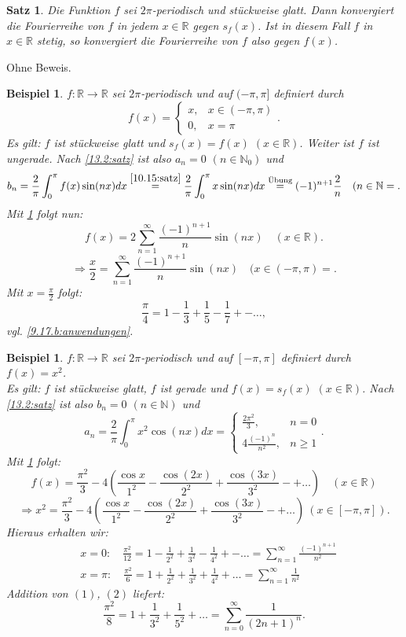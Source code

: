 \documentclass[12pt]{extreport} %
\newcommand{\N}{\mathbb{N}}
\newcommand{\R}{\mathbb{R}}
\theoremstyle{named}
\theoremstyle{itshape}
\newtheorem{satz}[unnamedtheorem]{Satz}
\theoremstyle{normal}
\newtheorem{beispiel}[unnamedtheorem]{Beispiel}
\begin{document}
{\begin{satz} \label{13.3:satz}
	Die Funktion $f$ sei $2\pi$-periodisch und stückweise glatt. Dann konvergiert die Fourierreihe von $f$ in jedem $x \in \R$ gegen $s_{f}(x)$. 
	Ist in diesem Fall $f$ in $x \in \R$ stetig, so konvergiert die Fourierreihe von $f$ also gegen $f(x)$.	
\end{satz}

Ohne Beweis.

\begin{beispiel} \label{13.4:bsp}
	$f \colon \R \rightarrow \R$ sei $2\pi$-periodisch und auf $(-\pi, \pi]$ definiert durch
	$$ f(x) = \begin{cases} x, & x \in (-\pi, \pi) \\ 0, & x = \pi \end{cases}. $$	
	Es gilt: $f$ ist stückweise glatt und $s_{f}(x) = f(x)$ $(x \in \R)$. Weiter ist $f$ ist ungerade. Nach \ref{13.2:satz} ist also $a_{n} = 0$ $(n \in \N_{0})$ und
	$$ b_{n} = \frac{2}{\pi} \int_{0}^{\pi} f(x) \sin(nx) dx \overset{\ref{10.15:satz}}{=} 
	\frac{2}{\pi} \int_{0}^{\pi} x \sin(nx) dx \overset{\text{Übung}}{=} (-1)^{n+1} \frac{2}{n} \quad (n \in \N=. $$
	Mit \ref{13.3:satz} folgt nun:
	$$ f(x) = 2 \sum_{n=1}^{\infty} \frac{(-1)^{n+1}}{n} \sin(nx) \quad (x \in \R).$$
	$$ \Rightarrow \frac{x}{2} = \sum_{n=1}^{\infty} \frac{(-1)^{n+1}}{n} \sin(nx) \quad (x \in (-\pi, \pi)=. $$
	Mit $x = \frac{\pi}{2}$ folgt: 
	$$\frac{\pi}{4} = 1 - \frac{1}{3} + \frac{1}{5} - \frac{1}{7} +- \dotsc,$$
	vgl. \ref{9.17.b:anwendungen}.
\end{beispiel}


\begin{beispiel} \label{13.5:bsp}
	$f \colon \R \rightarrow \R$ sei $2\pi$-periodisch und auf $[-\pi, \pi]$ definiert durch $f(x) = x^{2}$. \\
	Es gilt: $f$ ist stückweise glatt, $f$ ist gerade und $f(x) = s_{f}(x)$ $(x \in \R)$. Nach \ref{13.2:satz} ist also $b_{n} = 0$ $(n \in \N)$ und
	$$ a_{n} = \frac{2}{\pi} \int_{0}^{\pi} x^{2} \cos(nx) dx = \begin{cases} \frac{2 \pi^{2}}{3}, & n = 0 \\ 4 \frac{ (-1)^{n}}{n^{2}}, & n \ge 1 \end{cases}.  $$
	Mit \ref{13.3:satz} folgt:
	$$ f(x) = \frac{\pi^{2}}{3} - 4 \left( \frac{\cos x}{1^{2}} - \frac{\cos(2x)}{2^{2}} + \frac{\cos(3x)}{3^{2}} -+ \dotsc \right) \quad (x \in \R) $$
	$$\Rightarrow x^{2} = \frac{\pi^{2}}{3} - 4 \left( \frac{\cos x}{1^{2}} - \frac{\cos(2x)}{2^{2}} + \frac{\cos(3x)}{3^{2}} -+ \dotsc \right) ~ (x \in [-\pi, \pi]).$$
	Hieraus erhalten wir:
	\begin{align}
		& x = 0: \quad \frac{\pi^{2}}{12} = 1 - \frac{1}{2^{2}} + \frac{1}{3^{2}} - \frac{1}{4^{2}} +- \dotsc = \sum_{n=1}^{\infty} \frac{(-1)^{n+1}}{n^{2}} \tag{1} \\
		& x = \pi: \quad \frac{\pi^{2}}{6} = 1 + \frac{1}{2^{2}} + \frac{1}{3^{2}} + \frac{1}{4^{2}} + \dotsc = \sum_{n=1}^{\infty} \frac{1}{n^{2}} \tag{2}
	\end{align}
	Addition von $(1)$, $(2)$ liefert: 
	$$\frac{\pi^{2}}{8} = 1 + \frac{1}{3^{2}} + \frac{1}{5^{2}} + \dotsc = \sum_{n=0}^{\infty} \frac{1}{(2n +1)^{n}}.$$
\end{beispiel}

}
\end{document}
